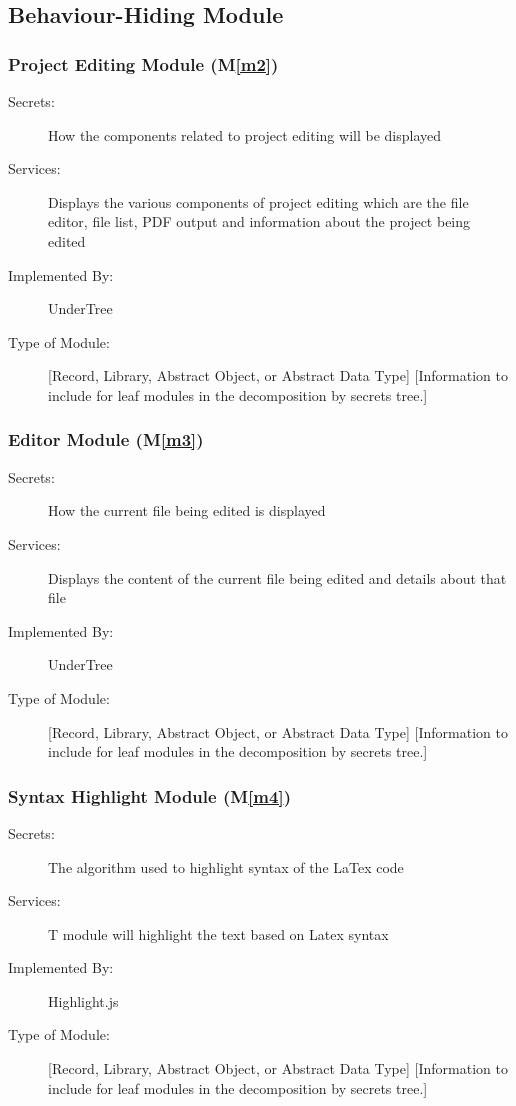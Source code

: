 \documentclass[12pt, titlepage]{article}
\newcommand{\mref}[1]{M\ref{#1}}
\begin{document}
	\subsection{Behaviour-Hiding Module}
	
	
	\subsubsection{Project Editing Module (\mref{m2})}
	
	\begin{description}
		\item[Secrets:] How the components related to project editing will be displayed
		\item[Services:] Displays the various components of project editing which are the file editor, file list, PDF output and information about the project being edited
		\item[Implemented By:] UnderTree
		\item[Type of Module:] [Record, Library, Abstract Object, or Abstract Data Type]
		[Information to include for leaf modules in the decomposition by secrets tree.]
	\end{description}
	
	\subsubsection{Editor Module (\mref{m3})}
	
	\begin{description}
		\item[Secrets:] How the current file being edited is displayed
		\item[Services:] Displays the content of the current file being edited and details about that file
		\item[Implemented By:] UnderTree
		\item[Type of Module:] [Record, Library, Abstract Object, or Abstract Data Type]
		[Information to include for leaf modules in the decomposition by secrets tree.]
	\end{description}
	
	\subsubsection{Syntax Highlight Module (\mref{m4})}
	
	\begin{description}
		\item[Secrets:] The algorithm used to highlight syntax of the LaTex code
		\item[Services:] T module will highlight the text based on Latex syntax
		\item[Implemented By:] Highlight.js
		\item[Type of Module:] [Record, Library, Abstract Object, or Abstract Data Type]
		[Information to include for leaf modules in the decomposition by secrets tree.]
	\end{description}
	
\end{document}
